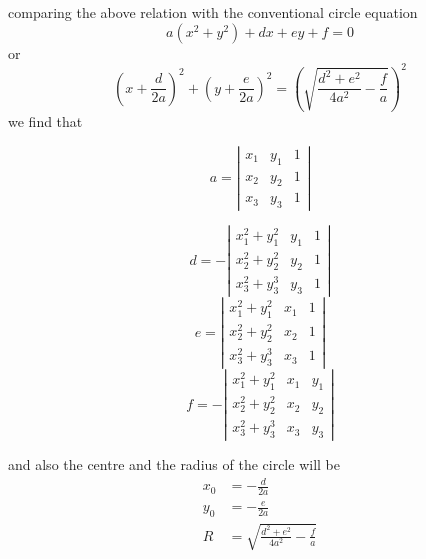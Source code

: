 comparing the above relation with the conventional circle equation
\begin{equation}
a(x^2+y^2)+dx+ey+f=0
\end{equation}
or
\begin{equation}
(x+\frac{d}{2a})^2+(y+\frac{e}{2a})^2=\left( \sqrt{\frac{d^2+e^2}{4a^2}-\frac{f}{a} } \right)^2
\end{equation}
we find that


\begin{equation}
a=
\left|
\begin{matrix}
 x_1 & y_1 & 1\\
 x_2 & y_2 & 1\\
 x_3 & y_3 & 1
\end{matrix}
\right|
\end{equation}

\begin{equation}
d=-
\left|
\begin{matrix}
x_1^2+y_1^2 & y_1 & 1\\
x_2^2+y_2^2 & y_2 & 1\\
x_3^2+y_3^3 & y_3  & 1
\end{matrix}
\right|
\end{equation}
\begin{equation}
e=
\left|
\begin{matrix}
x_1^2+y_1^2 & x_1 & 1\\
x_2^2+y_2^2 & x_2 & 1\\
x_3^2+y_3^3 & x_3 & 1
\end{matrix}
\right|
\end{equation}
\begin{equation}
f=-
\left|
\begin{matrix}
x_1^2+y_1^2 & x_1 & y_1 \\
x_2^2+y_2^2 & x_2 & y_2 \\
x_3^2+y_3^3 & x_3 & y_3
\end{matrix}
\right|
\end{equation}

and also the centre and the radius of the circle will be
\begin{equation}
 \begin{split}
x_0 &=-\frac{d}{2a}\\
y_0 &=-\frac{e}{2a}\\
R &=\sqrt{\frac{d^2+e^2}{4a^2}-\frac{f}{a}}
\end{split}
\end{equation}


  

